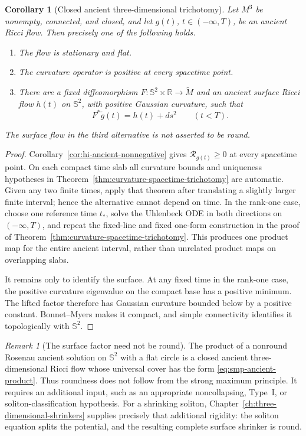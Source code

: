 \documentclass[10pt]{coll-l}
\newcommand{\R}{\mathbb{R}}
\newcommand{\Sph}{\mathbb{S}}
\newtheorem{corollary}[theorem]{Corollary}
\theoremstyle{definition}
\theoremstyle{remark}
\newtheorem{remark}[theorem]{Remark}
\numberwithin{section}{chapter}
\numberwithin{equation}{chapter}
\begin{document}
\begin{corollary}[Closed ancient three-dimensional trichotomy]
\label{cor:closed-ancient-curvature-trichotomy}
Let $M^3$ be nonempty, connected, and closed, and let
$g(t)$, $t\in(-\infty,T)$, be an ancient Ricci flow.  Then precisely one of
the following holds.
\begin{enumerate}
\item The flow is stationary and flat.
\item The curvature operator is positive at every spacetime point.
\item There are a fixed diffeomorphism
      $F\colon\Sph^2\times\R\to\widetilde M$ and an ancient surface Ricci
      flow $h(t)$ on $\Sph^2$, with positive Gaussian curvature, such that
      \begin{equation}
                    F^*\widetilde g(t)=h(t)+ds^2
                    \qquad(t<T).                         \label{eq:smp-ancient-product}
      \end{equation}
\end{enumerate}
The surface flow in the third alternative is not asserted to be round.
\end{corollary}

\begin{proof}
Corollary~\ref{cor:hi-ancient-nonnegative} gives
$\mathcal R_{g(t)}\geq0$ at every spacetime point.  On each compact time
slab all curvature bounds and uniqueness hypotheses in
Theorem~\ref{thm:curvature-spacetime-trichotomy} are automatic.  Given any
two finite times, apply that theorem after translating a slightly larger
finite interval; hence the alternative cannot depend on time.  In the
rank-one case, choose one reference time $t_*$, solve the Uhlenbeck ODE in
both directions on $(-\infty,T)$, and repeat the fixed-line and fixed
one-form construction in the proof of
Theorem~\ref{thm:curvature-spacetime-trichotomy}.  This produces one
product map for the entire ancient interval, rather than unrelated product
maps on overlapping slabs.

It remains only to identify the surface.  At any fixed time in the rank-one
case, the positive curvature eigenvalue on the compact base has a positive
minimum.  The lifted factor therefore has Gaussian curvature bounded below
by a positive constant.  Bonnet--Myers makes it compact, and simple
connectivity identifies it topologically with $\Sph^2$.
\end{proof}

\begin{remark}[The surface factor need not be round]
\label{rem:ancient-surface-not-round}
The product of a nonround Rosenau ancient solution on $\Sph^2$ with a flat
circle is a closed ancient three-dimensional Ricci flow whose universal
cover has the form \eqref{eq:smp-ancient-product}.  Thus roundness does not
follow from the strong maximum principle.  It requires an additional input,
such as an appropriate noncollapsing, Type~I, or soliton-classification
hypothesis.
For a shrinking soliton, Chapter~\ref{ch:three-dimensional-shrinkers}
supplies precisely that additional rigidity: the soliton equation splits
the potential, and the resulting complete surface shrinker is round.
\end{remark}
\end{document}
